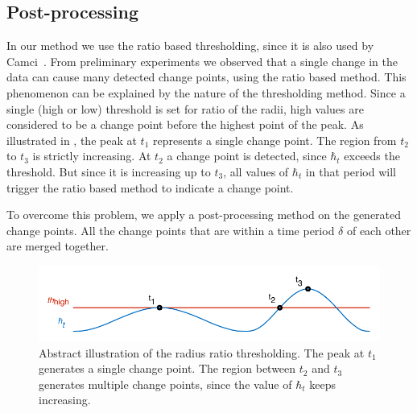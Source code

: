 \subsection{Post-processing}
In our method we use the ratio based thresholding, since it is also used by Camci~\cite{camci2010change}.
From preliminary experiments we observed that a single change in the data can cause many detected change points, using the ratio based method.
This phenomenon can be explained by the nature of the thresholding method.
Since a single (high or low) threshold is set for ratio of the radii, high values are considered to be a change point before the highest point of the peak.
As illustrated in , the peak at $t_1$ represents a single change point.
The region from $t_2$ to $t_3$ is strictly increasing.
At $t_2$ a change point is detected, since $\hbar_t$ exceeds the threshold.
But since it is increasing up to $t_3$, all values of $\hbar_t$ in that period will trigger the ratio based method to indicate a change point.

To overcome this problem, we apply a post-processing method on the generated change points.
All the change points that are within a time period $\delta$ of each other are merged together.

\begin{figure}
  \centering
    \includegraphics[width=\textwidth,height=\textheight,keepaspectratio]{./Figures/chapter4/signal_threshold.pdf}
  \caption[Thresholding]{Abstract illustration of the radius ratio thresholding. The peak at $t_1$ generates a single change point. The region between $t_2$ and $t_3$ generates multiple change points, since the value of $\hbar_t$ keeps increasing.}
  \label{fig:tresholding}
\end{figure}

